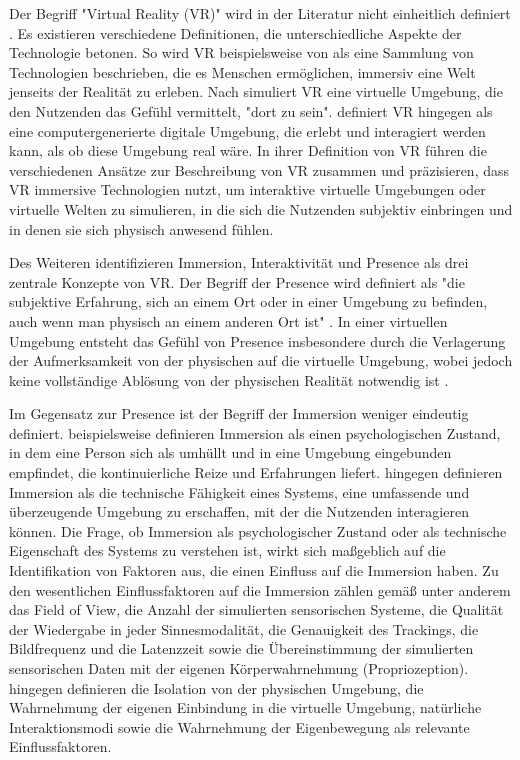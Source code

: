 Der Begriff "Virtual Reality (VR)" wird in der Literatur nicht einheitlich definiert \citep{wohlgenannt_virtual_2020}. Es existieren verschiedene Definitionen, die unterschiedliche Aspekte der Technologie betonen. So wird VR beispielsweise von \citet{berg_industry_2017} als eine Sammlung von Technologien beschrieben, die es Menschen ermöglichen, immersiv eine Welt jenseits der Realität zu erleben. 
Nach \citet{bowman_virtual_2007} simuliert VR eine virtuelle Umgebung, die den Nutzenden das Gefühl vermittelt, "dort zu sein". \citet{jerald_vr_2016} definiert VR hingegen als eine computergenerierte digitale Umgebung, die erlebt und interagiert werden kann, als ob diese Umgebung real wäre. In ihrer Definition von VR führen \citet{wohlgenannt_virtual_2020} die verschiedenen Ansätze zur Beschreibung von VR zusammen und präzisieren, dass VR immersive Technologien nutzt, um interaktive virtuelle Umgebungen oder virtuelle Welten zu simulieren, in die sich die Nutzenden subjektiv einbringen und in denen sie sich physisch anwesend fühlen.

Des Weiteren identifizieren \citet{walsh_virtual_2002} Immersion, Interaktivität und Presence als drei zentrale Konzepte von VR. Der Begriff der Presence wird definiert als "die subjektive Erfahrung, sich an einem Ort oder in einer Umgebung zu befinden, auch wenn man physisch an einem anderen Ort ist" \citep{witmer_measuring_1998}. In einer virtuellen Umgebung entsteht das Gefühl von Presence insbesondere durch die Verlagerung der Aufmerksamkeit von der physischen auf die virtuelle Umgebung, wobei jedoch keine vollständige Ablösung von der physischen Realität notwendig ist \citep{witmer_measuring_1998}. 

Im Gegensatz zur Presence ist der Begriff der Immersion weniger eindeutig definiert. \citet{witmer_measuring_1998} beispielsweise definieren Immersion als einen psychologischen Zustand, in dem eine Person sich als umhüllt und in eine Umgebung eingebunden empfindet, die kontinuierliche Reize und Erfahrungen liefert. \citet{sanchez-vives_presence_2005} hingegen definieren Immersion als die technische Fähigkeit eines Systems, eine umfassende und überzeugende Umgebung zu erschaffen, mit der die Nutzenden interagieren können. 
Die Frage, ob Immersion als psychologischer Zustand oder als technische Eigenschaft des Systems zu verstehen ist, wirkt sich maßgeblich auf die Identifikation von Faktoren aus, die einen Einfluss auf die Immersion haben. 
Zu den wesentlichen Einflussfaktoren auf die Immersion zählen gemäß  \citet{sanchez-vives_presence_2005} unter anderem das Field of View, die Anzahl der simulierten sensorischen Systeme, die Qualität der Wiedergabe in jeder Sinnesmodalität, die Genauigkeit des Trackings, die Bildfrequenz und die Latenzzeit sowie die Übereinstimmung der simulierten sensorischen Daten mit der eigenen Körperwahrnehmung (Propriozeption). \citet{witmer_measuring_1998} hingegen definieren die Isolation von der physischen Umgebung, die Wahrnehmung der eigenen Einbindung in die virtuelle Umgebung, natürliche Interaktionsmodi sowie die Wahrnehmung der Eigenbewegung als relevante Einflussfaktoren. 

